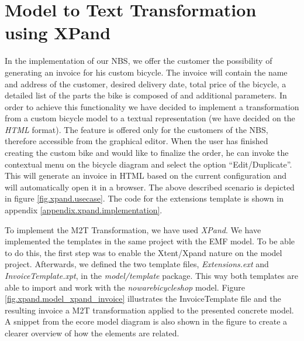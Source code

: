 \section{Model to Text Transformation using XPand}
\label{sec.m2t}
In the implementation of our NBS, we offer the customer the possibility of
generating an invoice for his custom bicycle. The invoice will contain the name
and address of the customer, desired delivery date, total price of the bicycle,
a detailed list of the parts the bike is composed of and additional parameters.
In order to achieve this functionality we have decided to implement a transformation from a custom bicycle model to a textual representation (we have decided on the \emph{HTML}
format). The feature is offered only for the customers of the NBS, therefore
accessible from the graphical editor. When the user has finished
creating the custom bike and would like to finalize the order, he can invoke the
contextual menu on the bicycle diagram and select the option ``Edit/Duplicate''.
This will generate an invoice in HTML based on the current configuration and
will automatically open it in a browser. The above described scenario is depicted
in figure \ref{fig.xpand.usecase}. The code for the extensions template is
shown in appendix \ref{appendix.xpand.implementation}.

To implement the M2T Transformation, we have used \emph{XPand}. We have
implemented the templates in the same project with the EMF model. To be able to
do this, the first step was to enable the Xtent/Xpand nature on the model
project. Afterwards, we defined the two template files, \emph{Extensions.ext}
and \emph{InvoiceTemplate.xpt}, in the \emph{model/template} package. This way
both templates are able to import and work with the \emph{nowarebicycleshop}
model. Figure \ref{fig.xpand.model_xpand_invoice} illustrates the
InvoiceTemplate file and the resulting invoice a M2T transformation applied to
the presented concrete model. A snippet from the ecore model diagram is also
shown in the figure to create a clearer overview of how the elements are
related.\\

